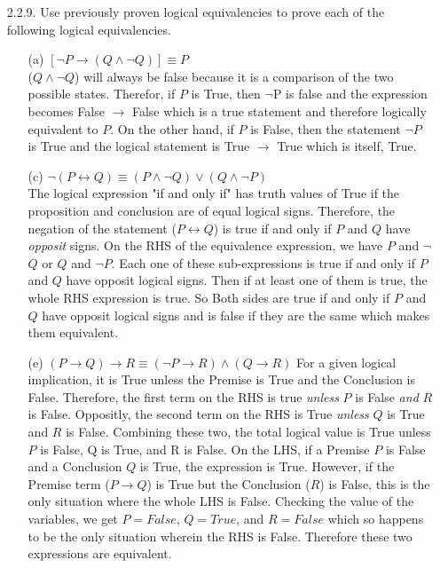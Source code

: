 \documentclass[12pt]{article}
\begin{document}
\begin{itemize}
\item[2.2.9.] Use previously proven logical equivalencies to prove each of the following logical equivalencies.
\begin{enumerate}
\item[(a)] $[\neg P\to (Q\wedge \neg Q)]\equiv P$\\
\indent ($Q\wedge \neg Q$) will always be false because it is a comparison of the two possible states.
Therefor, if $P$ is True, then $\neg$P is false and the expression becomes
False $\rightarrow$ False which is a true statement and therefore logically equivalent to $P$.
On the other hand, if $P$ is False, then the statement $\neg$$P$ is True and the logical statement is
True $\rightarrow$ True which is itself, True.
\item[(c)] $\neg(P\leftrightarrow Q)\equiv (P\wedge \neg Q)\vee (Q\wedge \neg P)$ \\
\indent The logical expression "if and only if" has truth values of True if the proposition and conclusion are
of equal logical signs. Therefore, the negation of the statement ($P\leftrightarrow Q$) is true if and only if 
$P$ and $Q$ have \emph{opposit} signs. On the RHS of the equivalence expression, we have $P$ and $\neg$$Q$ or 
$Q$ and $\neg$$P$. Each one of these sub-expressions is true if and only if $P$ and $Q$ have opposit logical
signs. Then if at least one of them is true, the whole RHS expression is true. So Both sides are true if and
only if $P$ and $Q$ have opposit logical signs and is false if they are the same which makes them equivalent.
\item[(e)] $(P\to Q)\to R\equiv (\neg P\to R)\wedge (Q\to R)$
\indent For a given logical implication, it is True unless the Premise is True and the Conclusion is False.
Therefore, the first term on the RHS is true \emph{unless} $P$ is False \emph{and} $R$ is False. Oppositly,
the second term on the RHS is True \emph{unless} $Q$ is True and $R$ is False. Combining these two, the total
logical value is True unless $P$ is False, Q is True, and R is False. On the LHS, if a Premise $P$ 
is False and a Conclusion $Q$ is True, the expression is True. However, if the Premise term ($P\rightarrow Q$)
is True but the Conclusion ($R$) is False, this is the only situation where the whole LHS is False. Checking
the value of the variables, we get $P=False$, $Q=True$, and $R=False$ which so happens to be the only situation
wherein the RHS is False. Therefore these two expressions are equivalent.
\end{enumerate}


\end{itemize}
\end{document}
